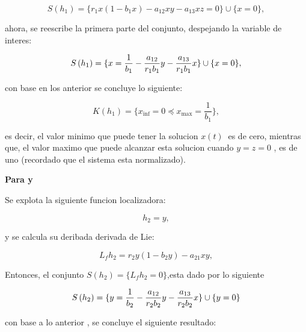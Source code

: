 \documentclass[letterpaper,11pt]{article}
\begin{document}
\begin{equation*}
S\left( h_{1}\right) =\{r_{1}x\left( 1-b_{1}x\right)
-a_{12}xy-a_{13}xz=0\}\cup \{x=0\},
\end{equation*}

\bigskip

ahora, se reescribe la primera parte del conjunto, despejando la variable de
interes:

\begin{equation*}
S\left( h_{1}\right) =\{x=\frac{1}{b_{1}}-\frac{a_{12}}{r_{1}b_{1}}y-\frac{%
a_{13}}{r_{1}b_{1}}x\}\cup \{x=0\},
\end{equation*}

\bigskip

con base en los anterior se concluye lo siguiente:

\bigskip 
\begin{equation*}
K\left( h_{1}\right) =\{x_{\inf }=0\preceq x_{\max }=\frac{1}{b_{1}}\},
\end{equation*}

\bigskip

es decir, el valor minimo que puede tener la solucion $x(t)$ $\ $es de cero,
mientras que, el valor maximo que puede alcanzar esta solucion cuando $y=z=0$%
, es de uno (recordado que el sistema esta normalizado).

\bigskip

\bigskip \textbf{Para y}

Se explota la siguiente funcion localizadora:

\begin{equation*}
h_{2}=y,
\end{equation*}

\bigskip y se calcula su deribada derivada de Lie:

\begin{equation*}
L_{f}h_{2}=r_{2}y\left( 1-b_{2}y\right) -a_{21}xy,
\end{equation*}

Entonces, el conjunto $S\left( h_{2}\right) =\{L_{f}h_{2}=0\}$,esta dado por
lo siguiente

\begin{equation*}
S\left( h_{2}\right) =\{y=\frac{1}{b_{2}}-\frac{a_{12}}{r_{2}b_{2}}y-\frac{%
a_{13}}{r_{2}b_{2}}x\}\cup \{y=0\}
\end{equation*}

\bigskip

con base a lo anterior , se concluye el siguiente resultado:

\bigskip
\end{document}
